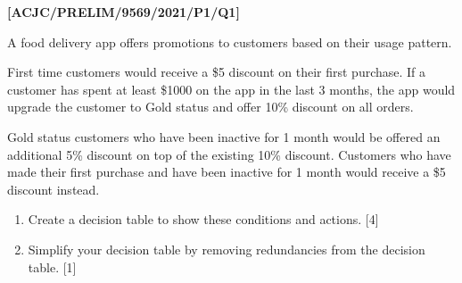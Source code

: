 \item \textbf{{[}ACJC/PRELIM/9569/2021/P1/Q1{]} }

A food delivery app offers promotions to customers based on their
usage pattern. 

First time customers would receive a \$5 discount on their first purchase.
If a customer has spent at least \$1000 on the app in the last 3 months,
the app would upgrade the customer to Gold status and offer 10\% discount
on all orders. 

Gold status customers who have been inactive for 1 month would be
offered an additional 5\% discount on top of the existing 10\% discount.
Customers who have made their first purchase and have been inactive
for 1 month would receive a \$5 discount instead. 
\begin{enumerate}
\item Create a decision table to show these conditions and actions. \hfill{}{[}4{]}
\item Simplify your decision table by removing redundancies from the decision
table. \hfill{}{[}1{]}
\end{enumerate}
